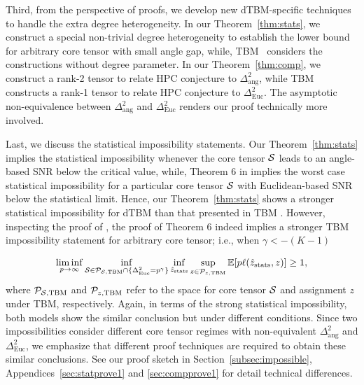 \documentclass[journal]{IEEEtran}
\theoremstyle{definition}
\theoremstyle{definition}
\begin{document}
\begin{itemize}[wide]
 Third, from the perspective of proofs, we develop new dTBM-specific techniques to handle the extra degree heterogeneity. In our Theorem~\ref{thm:stats}, we construct a special non-trivial degree heterogeneity to establish the lower bound for arbitrary core tensor with small angle gap, while, TBM~\citep{han2020exact} considers the constructions without degree parameter.
In our Theorem~\ref{thm:comp}, we construct a rank-2 tensor to relate HPC conjecture to $\Delta^2_{\text{ang}}$, while TBM~\citep{han2020exact} constructs a rank-1 tensor to relate HPC conjecture to $\Delta^2_{\text{Euc}}$. The asymptotic non-equivalence between $\Delta^2_{\text{ang}}$ and $\Delta^2_{\text{Euc}}$ renders our proof technically more involved.
 
 Last, we discuss the statistical impossibility statements. Our Theorem~\ref{thm:stats} implies the statistical impossibility whenever the core tensor $\mathcal{S}$ leads to an angle-based SNR below the critical value, while, Theorem 6 in \cite{han2020exact} implies the worst case statistical impossibility for a particular core tensor $\mathcal{S}$ with Euclidean-based SNR below the statistical limit. Hence, our Theorem~\ref{thm:stats} shows a stronger statistical impossibility for dTBM than that presented in TBM \cite[Theorem 6]{han2020exact}. However, inspecting the proof of \cite{han2020exact}, the proof of Theorem 6 indeed implies a stronger TBM impossibility statement for arbitrary core tensor; i.e., when $\gamma < -(K-1)$
 
 \vspace{-0.5cm}
 \small
 \begin{equation}
     \liminf_{p \rightarrow \infty} \inf_{ \mathcal{S} \in \mathcal{P}_{\mathcal{S}, {\rm TBM}} \cap \{\Delta_{\rm Euc}^2 = p^{\gamma} \} }\inf_{\hat z_{\rm stats}}  \sup_{z \in \mathcal{P}_{z, {\rm TBM}}}  \mathbb{E}[p \ell(\hat z_{\rm stats}, z)] \geq 1,
 \end{equation}
 \normalsize
 where $\mathcal{P}_{\mathcal{S}, {\rm TBM}}$ and $\mathcal{P}_{z, {\rm TBM}}$ refer to the space for core tensor $\mathcal{S}$ and assignment $z$ under TBM, respectively. Again, in terms of the strong statistical impossibility, both models show the similar conclusion but under different conditions. Since two impossibilities consider different core tensor regimes with non-equivalent $\Delta^2_{\text{ang}}$ and $\Delta^2_{\text{Euc}}$, we emphasize that different proof techniques are required to obtain these similar conclusions. See our proof sketch in Section~\ref{subsec:impossible}, Appendices~\ref{sec:statprove1} and \ref{sec:compprove1} for detail technical differences.


\end{itemize}
\end{document}
